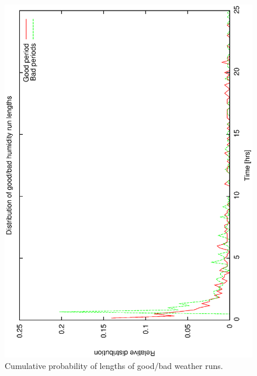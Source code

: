 {\begin{figure}[htbp] 
\begin{center}
    \includegraphics[scale=0.4, angle=-90]{figures/ecs/good_bad_hum_bin.eps}
\end{center}
\caption[Cumulative probability of lengths of good/bad weather runs.]
{Cumulative probability of lengths of good/bad weather runs.}
\label{fig:good_bad_hum_dist}
\end{figure}

}

